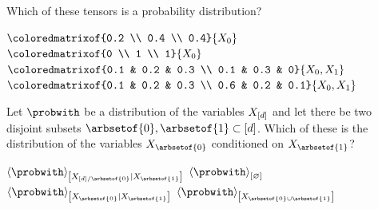 \documentclass[answers,12pt]{exam}
\begin{document}
\begin{questions}
        \question Which of these tensors is a probability distribution? \\
        \begin{oneparcheckboxes}
            \correctchoice $\coloredmatrixof{0.2 \\ 0.4 \\ 0.4}{\catvariableof{0}}$
            \choice $\coloredmatrixof{0 \\ 1 \\ 1}{\catvariableof{0}}$
            \correctchoice $\coloredmatrixof{0.1 & 0.2 & 0.3 \\ 0.1 & 0.3 & 0}{\catvariableof{0},\catvariableof{1}}$
            \choice $\coloredmatrixof{0.1 & 0.2 & 0.3 \\ 0.6 & 0.2 & 0.1}{\catvariableof{0},\catvariableof{1}}$
        \end{oneparcheckboxes}

        \question Let $\probwith$ be a distribution of the variables $X_{[d]}$ and let there be two disjoint subsets $\arbsetof{0},\arbsetof{1}\subset[\catorder]$.
        Which of these is the distribution of the variables $\catvariableof{\arbsetof{0}}$ conditioned on $\catvariableof{\arbsetof{1}}$? \\
        \begin{oneparcheckboxes}
            \choice $\normalizationofwrt{\probwith}{\catvariableof{[\catorder]/\arbsetof{0}}}{\catvariableof{\arbsetof{1}}}$
            \choice $\contraction{\probwith}$
            \correctchoice $\normalizationofwrt{\probwith}{\catvariableof{\arbsetof{0}}}{\catvariableof{\arbsetof{1}}}$
            \choice $\contractionof{\probwith}{\catvariableof{\arbsetof{0}\cup\arbsetof{1}}}$
        \end{oneparcheckboxes}

        \newpage


\end{questions}
\end{document}
